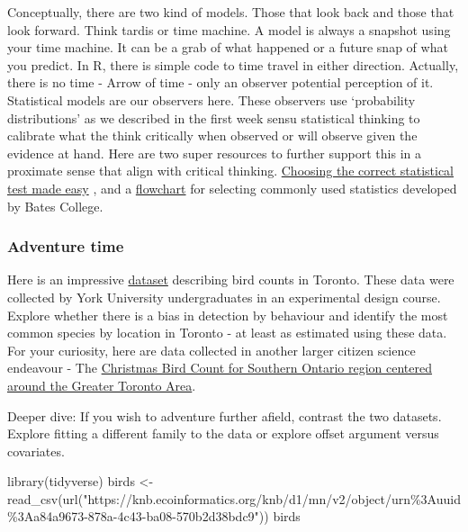 \documentclass[
]{book}
\newenvironment{Shaded}{\begin{snugshade}}{\end{snugshade}}
\newcommand{\FunctionTok}[1]{\textcolor[rgb]{0.00,0.00,0.00}{#1}}
\newcommand{\NormalTok}[1]{#1}
\newcommand{\OtherTok}[1]{\textcolor[rgb]{0.56,0.35,0.01}{#1}}
\newcommand{\StringTok}[1]{\textcolor[rgb]{0.31,0.60,0.02}{#1}}
\begin{document}
Conceptually, there are two kind of models. Those that look back and those that look forward. Think tardis or time machine. A model is always a snapshot using your time machine. It can be a grab of what happened or a future snap of what you predict. In R, there is simple code to time travel in either direction. Actually, there is no time - Arrow of time - only an observer potential perception of it. Statistical models are our observers here. These observers use `probability distributions' as we described in the first week sensu statistical thinking to calibrate what the think critically when observed or will observe given the evidence at hand. Here are two super resources to further support this in a proximate sense that align with critical thinking. \href{https://med.cmb.ac.lk/SMJ/VOLUME\%203\%20DOWNLOADS/Page\%2033-37\%20-\%20Choosing\%20the\%20correct\%20statistical\%20test\%20made\%20easy.pdf}{Choosing the correct statistical test made easy} \citep{RN7257}, and a \href{./flowchart.jpg}{flowchart} for selecting commonly used statistics developed by Bates College.

\hypertarget{adventure-time-3}{%
\subsubsection*{Adventure time}\label{adventure-time-3}}

Here is an impressive \href{https://knb.ecoinformatics.org/view/doi\%3A10.5063\%2F6M357V}{dataset} describing bird counts in Toronto. These data were collected by York University undergraduates in an experimental design course. Explore whether there is a bias in detection by behaviour and identify the most common species by location in Toronto - at least as estimated using these data. For your curiosity, here are data collected in another larger citizen science endeavour - The \href{https://knb.ecoinformatics.org/view/doi\%3A10.5063\%2FF1RF5SDJ}{Christmas Bird Count for Southern Ontario region centered around the Greater Toronto Area}.

Deeper dive: If you wish to adventure further afield, contrast the two datasets. Explore fitting a different family to the data or explore offset argument versus covariates.

\begin{Shaded}
\begin{Highlighting}[]
\FunctionTok{library}\NormalTok{(tidyverse)}
\NormalTok{birds }\OtherTok{\textless{}{-}} \FunctionTok{read\_csv}\NormalTok{(}\FunctionTok{url}\NormalTok{(}\StringTok{"https://knb.ecoinformatics.org/knb/d1/mn/v2/object/urn\%3Auuid\%3Aa84a9673{-}878a{-}4c43{-}ba08{-}570b2d38bdc9"}\NormalTok{))}
\NormalTok{birds}
\end{Highlighting}
\end{Shaded}
\end{document}
